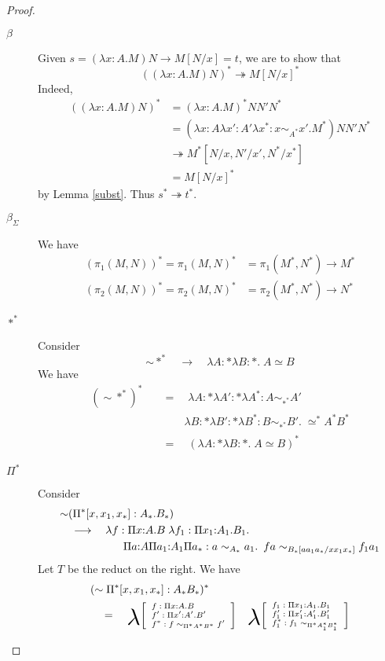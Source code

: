 \documentclass[10pt]{article}
\newcommand{\sta}{*}
\newcommand{\thra}{\twoheadrightarrow}
\newcommand{\eq}{\quad=\quad}
\newcommand{\phanq}{\phantom{\eq\qquad}}
\newcommand{\blam}{\raisebox{-2mm}{\scalebox{2.1}{$\lambda$}}}
\newcommand{\eeq}{\simeq}
\newcommand{\seq}{{\eeq}^*}
\newcommand{\ssim}{{\sim}}
\newcommand{\too}{\quad\longrightarrow\quad}
\newcommand{\trip}[3]{
{\scriptsize \left[
  \begin{array}{l}
    {#1}\\
    {#2}\\
    {#3}
  \end{array}
\right]}}
\newcommand{\ul}[1]{\underline{#1}}
\begin{document}
\begin{proof}
\newcommand{\st}{.\hspace{0.5em}}
\begin{description}
\item[\underline{$\beta$}] Given $s = (\lambda x : A. M) N \to M[N/x]
  = t$, we are to show that
\[((\lambda x {:} A. M) N)^* \thra M[N/x]^*\]
Indeed,
\begin{align*}
  ((\lambda x {:} A. M) N)^* &= (\lambda x{:}A.M)^* N N' N^*\\
&= (\lambda x{:}A \lambda x'{:}A' \lambda x^* : x \sim_{A^*} x'. M^*)
N N' N^*\\
&\thra M^*[N/x,N'/x',N^*/x^*]\\
&= M[N/x]^*
\end{align*}
by Lemma \ref{subst}.  Thus $s^* \thra t^*$.
\item[\underline{$\beta_\Sigma$}] We have
  \begin{align*}
    (\pi_1 (M,N))^* = \pi_1 (M,N)^* &= \pi_1 (M^*,N^*) \to M^*\\
    (\pi_2 (M,N))^* = \pi_2 (M,N)^* &= \pi_2 (M^*,N^*) \to N^*
  \end{align*}
\item[\underline{$\sta^*$}] Consider \[\ssim \sta^* \too \lambda A{:}\sta \lambda
  B{:}\sta.\; A \eeq B\]
We have 
\begin{align*} (\ssim \sta^*)^*
&\eq \lambda A{:}\sta \lambda A'{:}\sta \lambda A^* : A \sim_{\sta^*} A'\\
&\qquad\quad\lambda B{:}\sta \lambda B'{:}\sta \lambda B^* : B \sim_{\sta^*} B'.\;
\seq A^* B^*\\
&\eq (\lambda A{:}\sta \lambda B{:}\sta{}.\; A \eeq B)^*
\end{align*}
\item[\ul{$\Pi^\sta$}]  Consider
\begin{align*}
&\ssim (\Pi^* [x,x_1,x_*]:A_*. B_*)\\ &\too \lambda f : \Pi x{:}A. B \; \lambda f_1 :
\Pi x_1{:}A_1.B_1.\\
&\phanq\quad  \Pi a{:}A \Pi a_1{:}A_1 \Pi a_* : a \sim_{A_*} a_1
\st f a \sim_{B_* [a a_1 a_*/x x_1 x_*]} f_1 a_1
\end{align*}
Let $T$ be the reduct on the right.  We have
\begin{align*}
  &(\sim \Pi^*[x,x_1,x_*] : A_* B_*)^* \\ &\eq \blam \trip{f : \Pi x{:}A.B}
{f' : \Pi x'{:}A'. B'}{f^* : f \sim_{\Pi^* A^* B^*} f'}\quad
\blam \trip{f_1 : \Pi x_1{:}A_1.B_1}
{f'_1 : \Pi x'_1{:}A'_1. B'_1}{f_1^* : f_1 \sim_{\Pi^* A_1^*  B^*_1}
}
\end{align*}
\end{description}
\end{proof}
\end{document}

